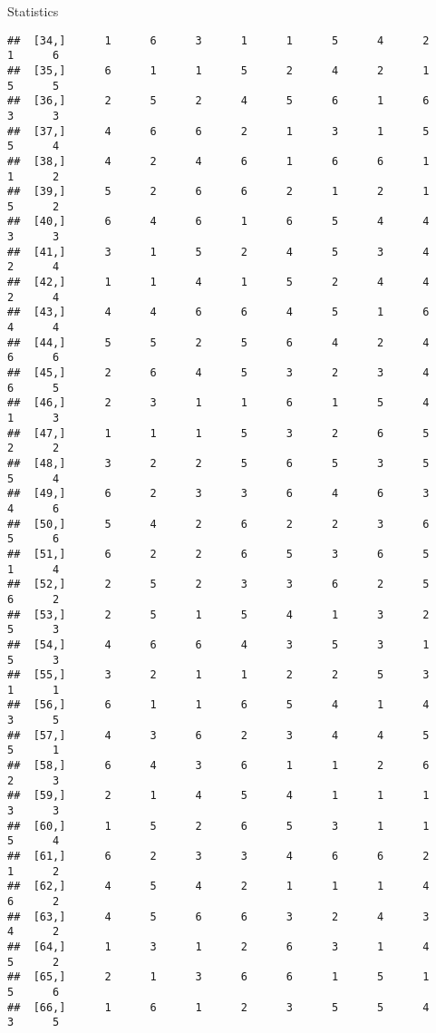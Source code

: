 \documentclass[
  ignorenonframetext,
]{beamer}
\begin{document}
\begin{frame}[fragile]{Statistics}
\begin{verbatim}
##  [34,]      1      6      3      1      1      5      4      2      1      6
##  [35,]      6      1      1      5      2      4      2      1      5      5
##  [36,]      2      5      2      4      5      6      1      6      3      3
##  [37,]      4      6      6      2      1      3      1      5      5      4
##  [38,]      4      2      4      6      1      6      6      1      1      2
##  [39,]      5      2      6      6      2      1      2      1      5      2
##  [40,]      6      4      6      1      6      5      4      4      3      3
##  [41,]      3      1      5      2      4      5      3      4      2      4
##  [42,]      1      1      4      1      5      2      4      4      2      4
##  [43,]      4      4      6      6      4      5      1      6      4      4
##  [44,]      5      5      2      5      6      4      2      4      6      6
##  [45,]      2      6      4      5      3      2      3      4      6      5
##  [46,]      2      3      1      1      6      1      5      4      1      3
##  [47,]      1      1      1      5      3      2      6      5      2      2
##  [48,]      3      2      2      5      6      5      3      5      5      4
##  [49,]      6      2      3      3      6      4      6      3      4      6
##  [50,]      5      4      2      6      2      2      3      6      5      6
##  [51,]      6      2      2      6      5      3      6      5      1      4
##  [52,]      2      5      2      3      3      6      2      5      6      2
##  [53,]      2      5      1      5      4      1      3      2      5      3
##  [54,]      4      6      6      4      3      5      3      1      5      3
##  [55,]      3      2      1      1      2      2      5      3      1      1
##  [56,]      6      1      1      6      5      4      1      4      3      5
##  [57,]      4      3      6      2      3      4      4      5      5      1
##  [58,]      6      4      3      6      1      1      2      6      2      3
##  [59,]      2      1      4      5      4      1      1      1      3      3
##  [60,]      1      5      2      6      5      3      1      1      5      4
##  [61,]      6      2      3      3      4      6      6      2      1      2
##  [62,]      4      5      4      2      1      1      1      4      6      2
##  [63,]      4      5      6      6      3      2      4      3      4      2
##  [64,]      1      3      1      2      6      3      1      4      5      2
##  [65,]      2      1      3      6      6      1      5      1      5      6
##  [66,]      1      6      1      2      3      5      5      4      3      5

\end{verbatim}
\end{frame}
\end{document}
